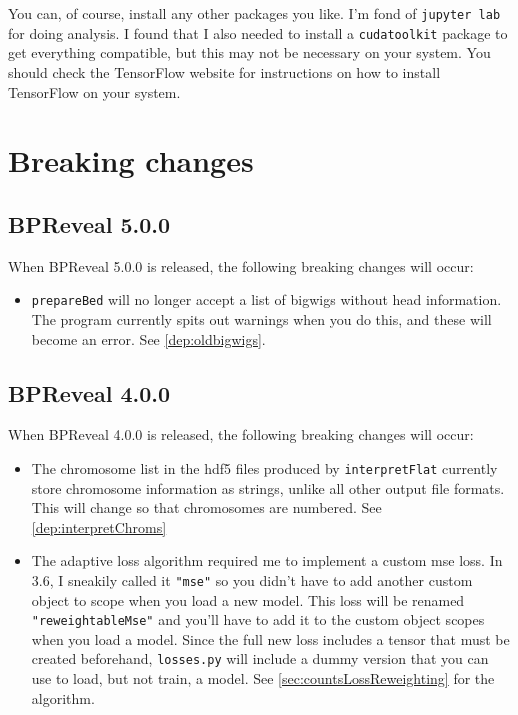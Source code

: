 \documentclass{article}
\begin{document}
You can, of course, install any other packages you like.
I'm fond of \texttt{jupyter lab} for doing analysis.
I found that I also needed to install a \texttt{cudatoolkit} package to get
everything compatible, but this may not be necessary on your system.
You should check the TensorFlow website for instructions on how to install
TensorFlow on your system.


\newpage

\section{Breaking changes}


\subsection{BPReveal 5.0.0}
When BPReveal 5.0.0 is released, the following breaking changes will occur:
\begin{itemize}
    \item \texttt{prepareBed} will no longer accept a list of bigwigs without
        head information.
        The program currently spits out warnings when you do this, and these
        will become an error.
        See \ref{dep:oldbigwigs}.
\end{itemize}

\subsection{BPReveal 4.0.0}
When BPReveal 4.0.0 is released, the following breaking changes will occur:
\begin{itemize}
    \item The chromosome list in the hdf5 files produced by
        \texttt{interpretFlat} currently store chromosome information as
        strings, unlike all other output file formats.
        This will change so that chromosomes are numbered.
        See \ref{dep:interpretChroms}
    \item The adaptive loss algorithm required me to implement a custom mse
        loss.
        In 3.6, I sneakily called it \texttt{"mse"} so you didn't have to add
        another custom object to scope when you load a new model.
        This loss will be renamed \texttt{"reweightableMse"} and you'll have to
        add it to the custom object scopes when you load a model.
        Since the full new loss includes a tensor that must be created
        beforehand, \texttt{losses.py} will include a dummy version that you
        can use to load, but not train, a model.
        See \ref{sec:countsLossReweighting} for the algorithm.
\end{itemize}
\end{document}
